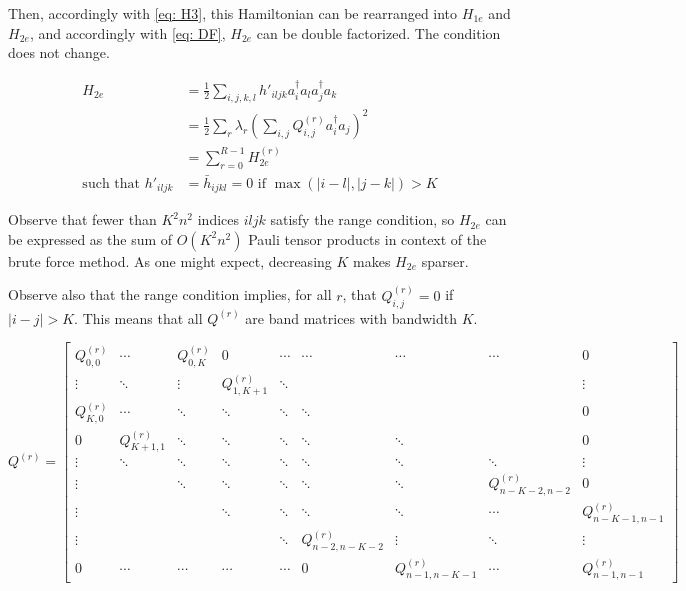Then, accordingly with \eqref{eq: H3}, this Hamiltonian can be rearranged into $H_{1e}$ and $H_{2e}$, and accordingly with \eqref{eq: DF}, $H_{2e}$ can be double factorized. The condition does not change.

\begin{equation}
    \begin{split}
        H_{2e} &= \frac{1}{2}\sum_{i,j,k,l} h'_{iljk}a^\dag_ia_la^\dag_ja_k \\
        &= \frac{1}{2}\sum_r\lambda_r\left(\sum_{i,j} Q^{(r)}_{i, j}a^\dag_ia_j\right)^2 \\
        &= \sum_{r = 0}^{R - 1} H_{2e}^{(r)} \\
        \text{such that } h'_{iljk} &= \bar{h}_{ijkl} = 0 \text{ if } \max(|i - l|, |j - k|) > K
    \end{split}
\end{equation}

Observe that fewer than $K^2n^2$ indices $iljk$ satisfy the range condition, so $H_{2e}$ can be expressed as the sum of $O(K^2n^2)$ Pauli tensor products in context of the brute force method. As one might expect, decreasing $K$ makes $H_{2e}$ sparser.

Observe also that the range condition implies, for all $r$, that $Q^{(r)}_{i, j} = 0$ if $|i - j| > K$. This means that all $Q^{(r)}$ are band matrices with bandwidth $K$.

\begin{equation}
    Q^{(r)} = \begin{bmatrix}
        Q^{(r)}_{0, 0} & \cdots & Q^{(r)}_{0, K} & 0 & \cdots & \cdots & \cdots & \cdots & 0 \\
        \vdots & \ddots & \vdots & Q^{(r)}_{1, K + 1} & \ddots & & & & \vdots \\
        Q^{(r)}_{K, 0} & \cdots & \ddots & \ddots & \ddots & \ddots & & & 0 \\
        0 & Q^{(r)}_{K + 1, 1} & \ddots & \ddots & \ddots & \ddots & \ddots & & 0 \\
        \vdots & \ddots & \ddots & \ddots & \ddots & \ddots & \ddots & \ddots & \vdots \\
        \vdots & & \ddots & \ddots & \ddots & \ddots & \ddots & Q^{(r)}_{n - K - 2, n - 2} & 0 \\
        \vdots & & & \ddots & \ddots & \ddots & \ddots & \cdots & Q^{(r)}_{n - K - 1, n - 1} \\
        \vdots & & & & \ddots & Q^{(r)}_{n - 2, n - K - 2} & \vdots & \ddots & \vdots \\
        0 & \cdots & \cdots & \cdots & \cdots & 0 & Q^{(r)}_{n - 1, n - K - 1} & \cdots & Q^{(r)}_{n - 1, n - 1}
    \end{bmatrix}
\end{equation}

